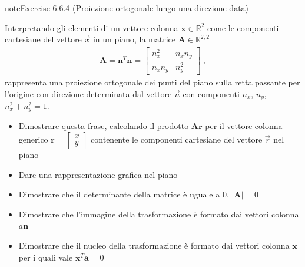 \documentclass[letterpaper,10pt,italian]{jupyterBook}
\begin{document}
\begin{sphinxadmonition}{note}{Exercise 6.6.4 (Proiezione ortogonale lungo una direzione data)}



\sphinxAtStartPar
Interpretando gli elementi di un vettore colonna \(\mathbf{x} \in \mathbb{R}^2\) come le componenti cartesiane del vettore \(\vec{x}\) in un piano, la matrice \(\mathbf{A} \in \mathbb{R}^{2,2}\)
\begin{equation*}
\begin{split}\mathbf{A} = \mathbf{n}^T \mathbf{n} = \begin{bmatrix} n_x^2 & n_x n_y \\  n_x n_y & n_y^2 \end{bmatrix} \ ,\end{split}
\end{equation*}
\sphinxAtStartPar
rappresenta una proiezione ortogonale dei punti del piano sulla retta passante per l’origine con direzione determinata dal vettore \(\vec{n}\) con componenti \(n_x\), \(n_y\), \(n_x^2 + n_y^2 = 1\).
\begin{itemize}
\item {} 
\sphinxAtStartPar
Dimostrare questa frase, calcolando il prodotto \(\mathbf{A} \mathbf{r}\) per il vettore colonna generico \(\mathbf{r} = \begin{bmatrix} x \\ y \end{bmatrix}\) contenente le componenti cartesiane del vettore \(\vec{r}\) nel piano

\item {} 
\sphinxAtStartPar
Dare una rappresentazione grafica nel piano

\item {} 
\sphinxAtStartPar
Dimostrare che il determinante della matrice è uguale a 0, \(|\mathbf{A}| = 0\)

\item {} 
\sphinxAtStartPar
Dimostrare che l’immagine della trasformazione è formato dai vettori colonna \(a \mathbf{n}\)

\item {} 
\sphinxAtStartPar
Dimostrare che il nucleo della trasformazione è formato dai vettori colonna \(\mathbf{x}\) per i quali vale \(\mathbf{x}^T \mathbf{a}=0\)

\end{itemize}
\end{sphinxadmonition}
 \label{exercise:ch/algebra/linear-algebra-exercise-11}
\end{document}
